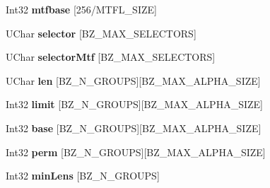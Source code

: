 \begin{DoxyCompactItemize}
\item 
Int32 {\bfseries mtfbase} \mbox{[}256/M\+T\+F\+L\+\_\+\+S\+I\+ZE\mbox{]}\hypertarget{struct_d_state_ac904f9b1d9853e89cec2e2eb641d5cf2}{}\label{struct_d_state_ac904f9b1d9853e89cec2e2eb641d5cf2}

\item 
U\+Char {\bfseries selector} \mbox{[}B\+Z\+\_\+\+M\+A\+X\+\_\+\+S\+E\+L\+E\+C\+T\+O\+RS\mbox{]}\hypertarget{struct_d_state_a1743228374dd82d180e7681606fab3a5}{}\label{struct_d_state_a1743228374dd82d180e7681606fab3a5}

\item 
U\+Char {\bfseries selector\+Mtf} \mbox{[}B\+Z\+\_\+\+M\+A\+X\+\_\+\+S\+E\+L\+E\+C\+T\+O\+RS\mbox{]}\hypertarget{struct_d_state_ac7409a930fc14261a1acd63f522bb41c}{}\label{struct_d_state_ac7409a930fc14261a1acd63f522bb41c}

\item 
U\+Char {\bfseries len} \mbox{[}B\+Z\+\_\+\+N\+\_\+\+G\+R\+O\+U\+PS\mbox{]}\mbox{[}B\+Z\+\_\+\+M\+A\+X\+\_\+\+A\+L\+P\+H\+A\+\_\+\+S\+I\+ZE\mbox{]}\hypertarget{struct_d_state_a88edd2962af797d38ea4a3c55be334f0}{}\label{struct_d_state_a88edd2962af797d38ea4a3c55be334f0}

\item 
Int32 {\bfseries limit} \mbox{[}B\+Z\+\_\+\+N\+\_\+\+G\+R\+O\+U\+PS\mbox{]}\mbox{[}B\+Z\+\_\+\+M\+A\+X\+\_\+\+A\+L\+P\+H\+A\+\_\+\+S\+I\+ZE\mbox{]}\hypertarget{struct_d_state_aea1992c1a30e81eaa3ecdde3b3896132}{}\label{struct_d_state_aea1992c1a30e81eaa3ecdde3b3896132}

\item 
Int32 {\bfseries base} \mbox{[}B\+Z\+\_\+\+N\+\_\+\+G\+R\+O\+U\+PS\mbox{]}\mbox{[}B\+Z\+\_\+\+M\+A\+X\+\_\+\+A\+L\+P\+H\+A\+\_\+\+S\+I\+ZE\mbox{]}\hypertarget{struct_d_state_a23de4c4eeba321c5ecbcd568be0a9a10}{}\label{struct_d_state_a23de4c4eeba321c5ecbcd568be0a9a10}

\item 
Int32 {\bfseries perm} \mbox{[}B\+Z\+\_\+\+N\+\_\+\+G\+R\+O\+U\+PS\mbox{]}\mbox{[}B\+Z\+\_\+\+M\+A\+X\+\_\+\+A\+L\+P\+H\+A\+\_\+\+S\+I\+ZE\mbox{]}\hypertarget{struct_d_state_a82ff7b0baca1439233c657fa0768d551}{}\label{struct_d_state_a82ff7b0baca1439233c657fa0768d551}

\item 
Int32 {\bfseries min\+Lens} \mbox{[}B\+Z\+\_\+\+N\+\_\+\+G\+R\+O\+U\+PS\mbox{]}\hypertarget{struct_d_state_a9944a4ca76768834180a835d97513e93}{}\label{struct_d_state_a9944a4ca76768834180a835d97513e93}


\end{DoxyCompactItemize}
